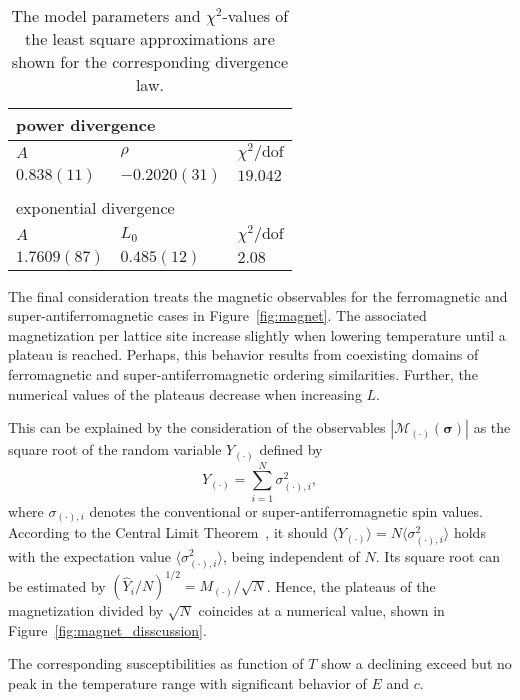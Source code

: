 \begin{table}[h]
  \centering
    \begin{tabular}{|lll|}
      \multicolumn{3}{l}{power divergence} \\
      \hline
      $A$ & $\rho$ & $\chi^2/\mathrm{dof}$ \\
      \hline
      $0.838(11)$ & $-0.2020(31)$ & $19.042$ \\
      \hline
      \multicolumn{3}{l}{}\\
      \multicolumn{3}{l}{exponential divergence} \\
      \hline
      $A$ & $L_0$ & $\chi^2/\mathrm{dof}$ \\
      \hline
      $1.7609(87)$ & $0.485(12)$ & $2.08$ \\
      \hline
    \end{tabular}
  \caption{The model parameters and $\chi^2$-values of the least square approximations are shown for the corresponding divergence law.}
  \label{table:fits_heat}
\end{table}


The final consideration treats the magnetic observables for the ferromagnetic and super-antiferromagnetic cases in Figure~\ref{fig:magnet}. 
The associated magnetization per lattice site increase slightly when lowering temperature until a plateau is reached.
Perhaps, this behavior results from coexisting domains of ferromagnetic and super-antiferromagnetic ordering similarities. Further, the numerical
values of the plateaus decrease when increasing $L$. 

This can be explained by the consideration of the observables $|\mathcal{M}_{(\cdot)}(\bm{\sigma})|$ 
as the square root of the random variable $Y_{(\cdot)}$ defined by
$$Y_{(\cdot)}\!=\!\sum_{i=1}^{N}\sigma_{(\cdot),i}^2,$$
where $\sigma_{(\cdot),i}$ denotes the conventional or super-antiferromagnetic spin values. According to the Central Limit Theorem~\cite[p.246]{Behrends2013}, it should 
$\langle Y_{(\cdot)}\rangle\!=\!N\langle\sigma_{(\cdot),i}^2\rangle$ holds with the expectation value $\langle\sigma_{(\cdot),i}^2\rangle$, being independent of $N$.
Its square root can be estimated by $(\hat{Y}_i/N)^{1/2}\!=\!M_{(\cdot)}/\sqrt{N}$. Hence, the plateaus of the magnetization divided by $\sqrt{N}$ coincides at a 
numerical value, shown in Figure~\ref{fig:magnet_disscussion}. 

The corresponding susceptibilities as function of $T$ show a declining exceed but no peak 
in the temperature range with significant behavior of $E$ and $c$.

